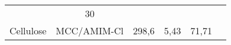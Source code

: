 \begin{table}[h!]
\begin{tabular}[t]{cccccc}
            &30
            &\cite{Liu2020a}\\
        \addlinespace
        Cellulose&MCC/AMIM-Cl&298,6&5,43
        &71,71
        &\cite{Ahankari2022, Xu2020}\\
        \bottomrule
    \end{tabular}
\end{table}